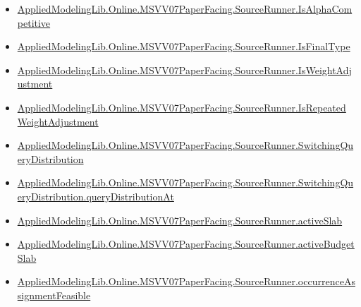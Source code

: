 \documentclass[10pt]{article}
\begin{document}
\begin{itemize}[leftmargin=1.2em]
\begin{itemize}[leftmargin=1.2em]
\item \hyperlink{paper-prerequisite-4ef8324da318759c}{Applied\allowbreak{}Modeling\allowbreak{}Lib.\allowbreak{}Online.\allowbreak{}MSVV07\allowbreak{}Paper\allowbreak{}Facing.\allowbreak{}Source\allowbreak{}Runner.\allowbreak{}Is\allowbreak{}Alpha\allowbreak{}Competitive}
\item \hyperlink{paper-prerequisite-b03abe34f2413cec}{Applied\allowbreak{}Modeling\allowbreak{}Lib.\allowbreak{}Online.\allowbreak{}MSVV07\allowbreak{}Paper\allowbreak{}Facing.\allowbreak{}Source\allowbreak{}Runner.\allowbreak{}Is\allowbreak{}Final\allowbreak{}Type}
\item \hyperlink{paper-prerequisite-f511985e61dbfb64}{Applied\allowbreak{}Modeling\allowbreak{}Lib.\allowbreak{}Online.\allowbreak{}MSVV07\allowbreak{}Paper\allowbreak{}Facing.\allowbreak{}Source\allowbreak{}Runner.\allowbreak{}Is\allowbreak{}Weight\allowbreak{}Adjustment}
\item \hyperlink{paper-prerequisite-eab5373dc7858bb2}{Applied\allowbreak{}Modeling\allowbreak{}Lib.\allowbreak{}Online.\allowbreak{}MSVV07\allowbreak{}Paper\allowbreak{}Facing.\allowbreak{}Source\allowbreak{}Runner.\allowbreak{}Is\allowbreak{}Repeated\allowbreak{}Weight\allowbreak{}Adjustment}
\item \hyperlink{paper-prerequisite-fdbead5a6c89ae2c}{Applied\allowbreak{}Modeling\allowbreak{}Lib.\allowbreak{}Online.\allowbreak{}MSVV07\allowbreak{}Paper\allowbreak{}Facing.\allowbreak{}Source\allowbreak{}Runner.\allowbreak{}Switching\allowbreak{}Query\allowbreak{}Distribution}
\item \hyperlink{paper-prerequisite-9bd0c7beac0b1526}{Applied\allowbreak{}Modeling\allowbreak{}Lib.\allowbreak{}Online.\allowbreak{}MSVV07\allowbreak{}Paper\allowbreak{}Facing.\allowbreak{}Source\allowbreak{}Runner.\allowbreak{}Switching\allowbreak{}Query\allowbreak{}Distribution.\allowbreak{}query\allowbreak{}Distribution\allowbreak{}At}
\item \hyperlink{paper-prerequisite-044a4f834ea0a73a}{Applied\allowbreak{}Modeling\allowbreak{}Lib.\allowbreak{}Online.\allowbreak{}MSVV07\allowbreak{}Paper\allowbreak{}Facing.\allowbreak{}Source\allowbreak{}Runner.\allowbreak{}active\allowbreak{}Slab}
\item \hyperlink{paper-prerequisite-84b93a2351446dd2}{Applied\allowbreak{}Modeling\allowbreak{}Lib.\allowbreak{}Online.\allowbreak{}MSVV07\allowbreak{}Paper\allowbreak{}Facing.\allowbreak{}Source\allowbreak{}Runner.\allowbreak{}active\allowbreak{}Budget\allowbreak{}Slab}
\item \hyperlink{paper-prerequisite-2c878fdf44b4b3b2}{Applied\allowbreak{}Modeling\allowbreak{}Lib.\allowbreak{}Online.\allowbreak{}MSVV07\allowbreak{}Paper\allowbreak{}Facing.\allowbreak{}Source\allowbreak{}Runner.\allowbreak{}occurrence\allowbreak{}Assignment\allowbreak{}Feasible}

\end{itemize}
\end{itemize}
\end{document}

